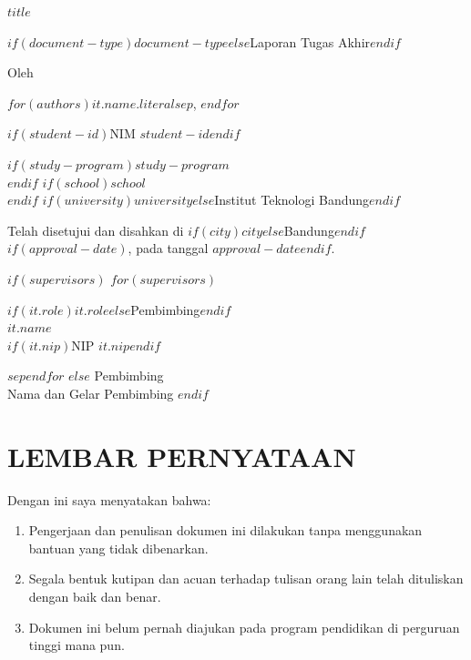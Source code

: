 \thispagestyle{empty}
\begin{center}
  \Large\bfseries\MakeUppercase{$title$}

  \vfill
  \Large $if(document-type)$$document-type$$else$Laporan Tugas Akhir$endif$

  \vfill
  \large Oleh

  \medskip
  \Large $for(authors)$$it.name.literal$$sep$, $endfor$

  $if(student-id)$\large NIM $student-id$$endif$

  \medskip
  \large
  $if(study-program)$$study-program$\\$endif$
  $if(school)$$school$\\$endif$
  $if(university)$$university$$else$Institut Teknologi Bandung$endif$

  \vfill
  \normalsize\normalfont
  Telah disetujui dan disahkan di
  $if(city)$$city$$else$Bandung$endif$$if(approval-date)$, pada tanggal $approval-date$$endif$.

  \vfill
  $if(supervisors)$
  $for(supervisors)$
  \begin{minipage}[t]{0.45\textwidth}
    \centering
    $if(it.role)$$it.role$$else$Pembimbing$endif$\\[25mm]
    $it.name$\\
    $if(it.nip)$NIP $it.nip$$endif$
  \end{minipage}
  $sep$\hfill$endfor$
  $else$
  Pembimbing\\[25mm]
  Nama dan Gelar Pembimbing
  $endif$
\end{center}
\clearpage

\chapter*{LEMBAR PERNYATAAN}
\thispagestyle{empty}

Dengan ini saya menyatakan bahwa:

\begin{enumerate}
  \item Pengerjaan dan penulisan dokumen ini dilakukan tanpa menggunakan bantuan yang tidak dibenarkan.
  \item Segala bentuk kutipan dan acuan terhadap tulisan orang lain telah dituliskan dengan baik dan benar.
  \item Dokumen ini belum pernah diajukan pada program pendidikan di perguruan tinggi mana pun.
\end{enumerate}

